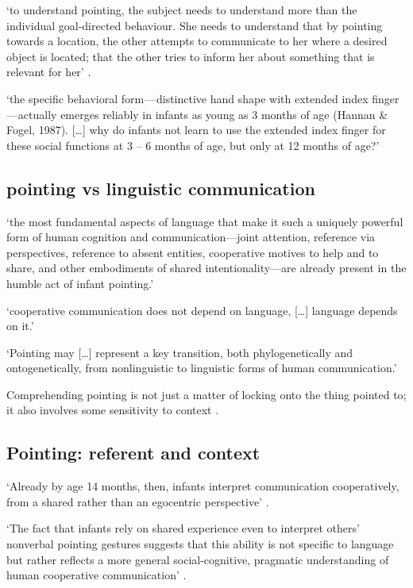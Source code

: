 \documentclass[12pt]{extarticle}
\begin{document}
\begin{multicols}{3}
‘to understand pointing, the subject needs to understand more than the individual goal-directed behaviour. She needs to understand that by pointing towards a location, the other attempts to communicate to her where a desired object is located; that the other tries to inform her about something that is relevant for her’
\citep[p.\ 6]{Moll:2007gu}.
 
‘the specific behavioral form — distinctive hand shape with extended index finger — actually emerges reliably in infants as young as 3 months of age (Hannan \& Fogel, 1987). […] why do infants not learn to use the extended index finger for these social functions at 3 – 6 months of age, but only at 12 months of age?’ \citep[p.\ 716]{Tomasello:2007fi}
 
\subsection{pointing vs linguistic communication}
 
‘the most fundamental aspects of language that make it such a uniquely powerful form of human cognition and communication---joint attention, reference via perspectives, reference to absent entities, cooperative motives to help and to share, and other embodiments of shared intentionality---are already present in the humble act of infant pointing.’ \citep[p.\ 719]{Tomasello:2007fi}
 
‘cooperative communication does not depend on language, […] language depends on it.’ \citep[p.\ 720]{Tomasello:2007fi}
 
‘Pointing may […] represent a key transition, both phylogenetically and ontogenetically, from nonlinguistic to linguistic forms of human communication.’ \citep[p.\ 720]{Tomasello:2007fi}
 
Comprehending pointing is not just a matter of locking onto the thing pointed to; it also involves some sensitivity to context \citep[see][]{Liebal:2010lr}.
 
\subsection{Pointing: referent and context}
 
‘Already by age 14 months, then, infants interpret communication cooperatively, from a shared rather than an egocentric perspective’ \citep[p.\ 269]{Liebal:2010lr}.
 
‘The fact that infants rely on shared experience even to interpret others’ nonverbal pointing gestures suggests that this ability is not specific to language but rather reflects a more general social-cognitive, pragmatic understanding of human cooperative communication’ \citep[p.\ 270]{Liebal:2010lr}.
 

\end{multicols}
\end{document}
